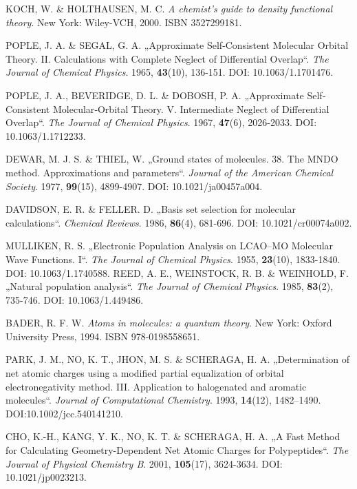 \begin{thebibliography}{10}
KOCH, W. \& HOLTHAUSEN, M. C. \textit{A chemist's guide to density functional theory}. New York: Wiley-VCH, 2000. ISBN 3527299181.

POPLE, J. A. \& SEGAL, G. A. „Approximate Self‐Consistent Molecular Orbital Theory. II. Calculations with Complete Neglect of Differential Overlap“. \textit{The Journal of Chemical Physics}. 1965, \textbf{43}(10), 136-151. DOI: 10.1063/1.1701476.

POPLE, J. A., BEVERIDGE, D. L. \& DOBOSH, P. A. „Approximate Self‐Consistent Molecular‐Orbital Theory. V. Intermediate Neglect of Differential Overlap“. \textit{The Journal of Chemical Physics}. 1967, \textbf{47}(6), 2026-2033. DOI: 10.1063/1.1712233.

DEWAR, M. J. S. \& THIEL, W. „Ground states of molecules. 38. The MNDO method. Approximations and parameters“. \textit{Journal of the American Chemical Society}. 1977, \textbf{99}(15), 4899-4907. DOI: 10.1021/ja00457a004.

DAVIDSON, E. R. \& FELLER. D. „Basis set selection for molecular calculations“. \textit{Chemical Reviews}. 1986, \textbf{86}(4), 681-696. DOI: 10.1021/cr00074a002. 

MULLIKEN, R. S. „Electronic Population Analysis on LCAO–MO Molecular Wave Functions. I“. \textit{The Journal of Chemical Physics}. 1955, \textbf{23}(10), 1833-1840. DOI: 10.1063/1.1740588. 
REED, A. E., WEINSTOCK, R. B. \& WEINHOLD, F. „Natural population analysis“. \textit{The Journal of Chemical Physics}. 1985, \textbf{83}(2), 735-746. DOI: 10.1063/1.449486.

BADER, R. F. W. \textit{Atoms in molecules: a quantum theory}. New York: Oxford University Press, 1994. ISBN 978-0198558651.

PARK, J. M., NO, K. T., JHON, M. S. \& SCHERAGA, H. A. „Determination of net atomic charges using a modified partial equalization of orbital electronegativity method. III. Application to halogenated and aromatic molecules“. \textit{Journal of Computational Chemistry}. 1993, \textbf{14}(12), 1482–1490. DOI:10.1002/jcc.540141210.

CHO, K.-H., KANG, Y. K., NO, K. T. \& SCHERAGA, H. A. „A Fast Method for Calculating Geometry-Dependent Net Atomic Charges for Polypeptides“. \textit{The Journal of Physical Chemistry B}. 2001, \textbf{105}(17), 3624-3634. DOI: 10.1021/jp0023213.


\end{thebibliography}
